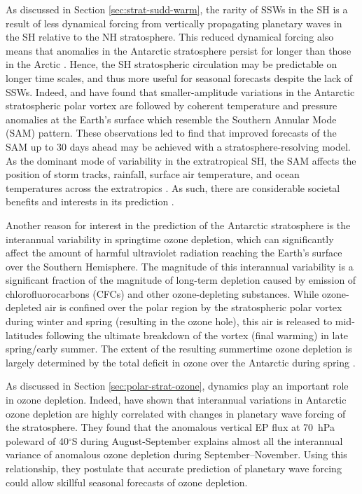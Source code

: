 As discussed in Section \ref{sec:strat-sudd-warm}, the rarity of SSWs in the SH
is a result of less dynamical forcing from vertically propagating planetary
waves in the SH relative to the NH stratosphere. This reduced dynamical forcing
also means that anomalies in the Antarctic stratosphere persist for longer than
those in the Arctic \citep{Simpson2011}. Hence, the SH stratospheric circulation
may be predictable on longer time scales, and thus more useful for seasonal
forecasts despite the lack of SSWs. Indeed, \citet{Thompson2005} and
\citet{Son2013a} have found that smaller-amplitude variations in the Antarctic
stratospheric polar vortex are followed by coherent temperature and pressure
anomalies at the Earth's surface which resemble the Southern Annular Mode (SAM)
pattern. These observations led \citet{Roff2011} to find that improved forecasts
of the SAM up to 30 days ahead may be achieved with a stratosphere-resolving
model. As the dominant mode of variability in the extratropical SH, the SAM
affects the position of storm tracks, rainfall, surface air temperature, and
ocean temperatures across the extratropics \citep[e.g.,][]{Silvestri2003,
  Reason2005, Hendon2007}. As such, there are considerable societal benefits and
interests in its prediction \citep{Lim2013}.

Another reason for interest in the prediction of the Antarctic stratosphere is
the interannual variability in springtime ozone depletion, which can
significantly affect the amount of harmful ultraviolet radiation reaching the
Earth's surface over the Southern Hemisphere. The magnitude of this interannual
variability is a significant fraction of the magnitude of long-term depletion
caused by emission of chlorofluorocarbons (CFCs) and other ozone-depleting
substances. While ozone-depleted air is confined over the polar region by the
stratospheric polar vortex during winter and spring (resulting in the ozone
hole), this air is released to mid-latitudes following the ultimate breakdown of
the vortex (final warming) in late spring/early summer. The extent of the
resulting summertime ozone depletion is largely determined by the total deficit
in ozone over the Antarctic during spring \citep{Bodeker2005}.

As discussed in Section \ref{sec:polar-strat-ozone}, dynamics play an important
role in ozone depletion. Indeed, \citet{Salby2012} have shown that interannual
variations in Antarctic ozone depletion are highly correlated with changes in
planetary wave forcing of the stratosphere. They found that the anomalous
vertical EP flux at 70~hPa poleward of 40$^{\circ}$S during August-September
explains almost all the interannual variance of anomalous ozone depletion during
September--November. Using this relationship, they postulate that accurate
prediction of planetary wave forcing could allow skillful seasonal forecasts of
ozone depletion.

